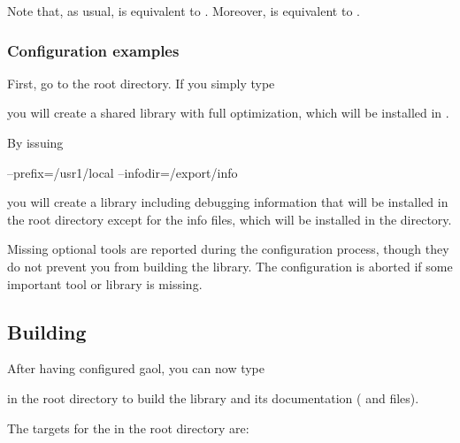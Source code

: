 \documentclass{manual}
\begin{document}
Note that, as usual,  is
equivalent to . Moreover,
 is equivalent to
.

\subsubsection{Configuration examples}

First, go to the root directory. If you simply type
\begin{cmdshell}
\end{cmdshell}
you will create a shared library with full optimization, which will be
installed in .

\noindent By issuing

\begin{cmdshell}
              --prefix=/usr1/local --infodir=/export/info
\end{cmdshell}

you will create a library including
debugging information that will be installed in the root directory
 except for the info files, which will be installed in
the  directory.

Missing optional tools are reported during the configuration process,
though they do not prevent you from building the library. The
configuration is aborted if some important tool or library is missing.


\subsection{Building}

After having configured gaol, you can now type

\begin{cmdshell}
\end{cmdshell}
in the root directory to build the library and its documentation
( and  files).

The targets for the  in the root directory are:
\end{document}
